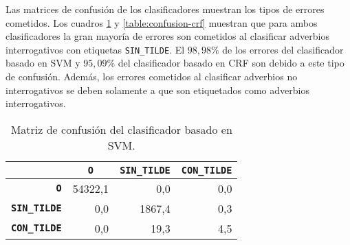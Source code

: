 \documentclass[runningheads,a4paper]{llncs}
\begin{document}
Las matrices de confusi\'on de los clasificadores muestran los tipos de errores cometidos. Los cuadros \ref{table:confusion-svm} y \ref{table:confusion-crf} muestran que para ambos clasificadores la gran mayor\'ia de errores son cometidos al clasificar adverbios interrogativos con etiquetas \texttt{\small SIN\_TILDE}. El $98,98\%$ de los errores del clasificador basado en SVM y $95,09\%$ del clasificador basado en CRF son debido a este tipo de confusi\'on. Además, los errores cometidos al clasificar adverbios no interrogativos se deben solamente a que son etiquetados como adverbios interrogativos.

\begin{table}[ht]
	\addtolength{\belowcaptionskip}{-2mm}
 	\renewcommand{\arraystretch}{1.3}
	\renewcommand{\tabcolsep}{3pt}
	\caption{Matriz de confusión del clasificador basado en SVM.}
	\label{table:confusion-svm}
	\centering
	\begin{tabular}{|r||r|r|r|}
		\hline
			& \multicolumn{1}{c|}{\textbf{\texttt{~O~}}}
			& \multicolumn{1}{c|}{\textbf{\texttt{SIN\_TILDE}}}
			& \multicolumn{1}{c|}{\textbf{\texttt{CON\_TILDE}}} \\
		\hline\hline
		\textbf{\texttt{O}} & 54322,1 & 0,0 & 0,0 \\ \hline
		\textbf{\texttt{SIN\_TILDE}} & 0,0 & 1867,4 & 0,3 \\ \hline
		\textbf{\texttt{CON\_TILDE}} & 0,0 & 19,3 & 4,5 \\ 
		\hline
	\end{tabular}
\end{table}
\end{document}
